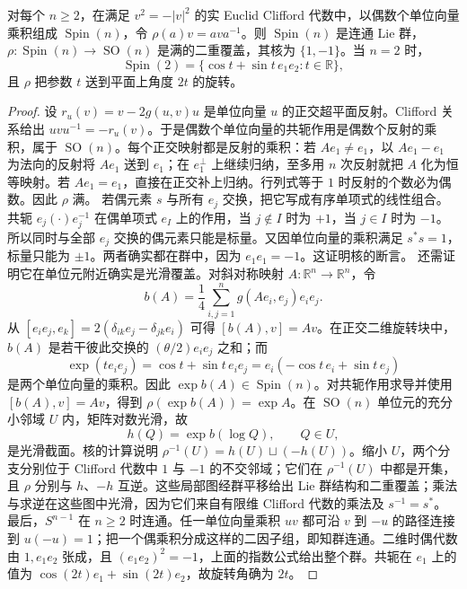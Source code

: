\begin{theorem}\label{g3:thm:spin-double-cover}
	对每个 \(n\ge2\)，在满足 \(v^2=-|v|^2\) 的实 Euclid Clifford 代数中，以偶数个单位向量乘积组成 \(\operatorname{Spin}(n)\)，令 \(\rho(a)v=ava^{-1}\)。则 \(\operatorname{Spin}(n)\) 是连通 Lie 群，\(\rho:\operatorname{Spin}(n)\to\operatorname{SO}(n)\) 是满的二重覆盖，其核为 \(\{1,-1\}\)。当 \(n=2\) 时，
	\[
		\operatorname{Spin}(2)=\{\cos t+\sin t\,e_1e_2:t\in\mathbb R\},
	\]
	且 \(\rho\) 把参数 \(t\) 送到平面上角度 \(2t\) 的旋转。
\end{theorem}
\begin{proof}
	设 \(r_u(v)=v-2g(u,v)u\) 是单位向量 \(u\) 的正交超平面反射。Clifford 关系给出 \(uvu^{-1}=-r_u(v)\)。于是偶数个单位向量的共轭作用是偶数个反射的乘积，属于 \(\operatorname{SO}(n)\)。每个正交映射都是反射的乘积：若 \(Ae_1\ne e_1\)，以 \(Ae_1-e_1\) 为法向的反射将 \(Ae_1\) 送到 \(e_1\)；在 \(e_1^\perp\) 上继续归纳，至多用 \(n\) 次反射就把 \(A\) 化为恒等映射。若 \(Ae_1=e_1\)，直接在正交补上归纳。行列式等于 \(1\) 时反射的个数必为偶数。因此 \(\rho\) 满。
	若偶元素 \(s\) 与所有 \(e_j\) 交换，把它写成有序单项式的线性组合。共轭 \(e_j(\cdot)e_j^{-1}\) 在偶单项式 \(e_I\) 上的作用，当 \(j\notin I\) 时为 \(+1\)，当 \(j\in I\) 时为 \(-1\)。所以同时与全部 \(e_j\) 交换的偶元素只能是标量。又因单位向量的乘积满足 \(s^*s=1\)，标量只能为 \(\pm1\)。两者确实都在群中，因为 \(e_1e_1=-1\)。这证明核的断言。
	还需证明它在单位元附近确实是光滑覆盖。对斜对称映射 \(A:\mathbb R^n\to\mathbb R^n\)，令
	\begin{equation}\label{g3:eq:spin-lie-algebra-lift}
		b(A)=\frac14\sum_{i,j=1}^n g(Ae_i,e_j)e_ie_j.
	\end{equation}
	从
	\([e_ie_j,e_k]=2(\delta_{ik}e_j-\delta_{jk}e_i)\)
	可得 \([b(A),v]=Av\)。在正交二维旋转块中，\(b(A)\) 是若干彼此交换的 \((\theta/2)e_ie_j\) 之和；而
	\[
		\exp(te_ie_j)=\cos t+\sin t\,e_ie_j
		=e_i(-\cos t\,e_i+\sin t\,e_j)
	\]
	是两个单位向量的乘积。因此 \(\exp b(A)\in\operatorname{Spin}(n)\)。对共轭作用求导并使用 \([b(A),v]=Av\)，得到 \(\rho(\exp b(A))=\exp A\)。在 \(\operatorname{SO}(n)\) 单位元的充分小邻域 \(U\) 内，矩阵对数光滑，故
	\[
		h(Q)=\exp b(\log Q),\qquad Q\in U,
	\]
	是光滑截面。核的计算说明 \(\rho^{-1}(U)=h(U)\sqcup(-h(U))\)。缩小 \(U\)，两个分支分别位于 Clifford 代数中 \(1\) 与 \(-1\) 的不交邻域；它们在 \(\rho^{-1}(U)\) 中都是开集，且 \(\rho\) 分别与 \(h\)、\(-h\) 互逆。这些局部图经群平移给出 Lie 群结构和二重覆盖；乘法与求逆在这些图中光滑，因为它们来自有限维 Clifford 代数的乘法及 \(s^{-1}=s^*\)。
	最后，\(S^{n-1}\) 在 \(n\ge2\) 时连通。任一单位向量乘积 \(uv\) 都可沿 \(v\) 到 \(-u\) 的路径连接到 \(u(-u)=1\)；把一个偶乘积分成这样的二因子组，即知群连通。二维时偶代数由 \(1,e_1e_2\) 张成，且 \((e_1e_2)^2=-1\)，上面的指数公式给出整个群。共轭在 \(e_1\) 上的值为 \(\cos(2t)e_1+\sin(2t)e_2\)，故旋转角确为 \(2t\)。
\end{proof}

